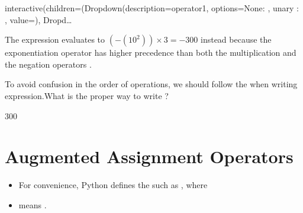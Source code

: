 \documentclass[letterpaper,10pt,english]{sphinxmanual}
\begin{document}
\begin{sphinxVerbatim}[commandchars=\\\{\}]
interactive(children=(Dropdown(description=\PYGZsq{}operator1\PYGZsq{}, options=\PYGZob{}\PYGZsq{}None\PYGZsq{}: \PYGZsq{}\PYGZsq{}, \PYGZsq{}unary \PYGZhy{}\PYGZsq{}: \PYGZsq{}\PYGZhy{}\PYGZsq{}\PYGZcb{}, value=\PYGZsq{}\PYGZsq{}), Dropd…
\end{sphinxVerbatim}

The expression evaluates to \((-(10^2))\times 3=-300\) instead because the exponentiation operator \sphinxcode{\sphinxupquote{**}} has higher precedence than both the multiplication \sphinxcode{\sphinxupquote{*}} and the negation operators \sphinxcode{\sphinxupquote{\sphinxhyphen{}}}.

 To avoid confusion in the order of operations, we should follow the  when writing expression.What is the proper way to write ?

\begin{sphinxVerbatim}[commandchars=\\\{\}]
    
  
\end{sphinxVerbatim}

\begin{sphinxVerbatim}[commandchars=\\\{\}]
\PYGZhy{}300
\end{sphinxVerbatim}


\section{Augmented Assignment Operators}
\label{\detokenize{Lecture2/Expressions and Arithmetic:augmented-assignment-operators}}\begin{itemize}
\item {} 
For convenience, Python defines the  such as \sphinxcode{\sphinxupquote{+=}}, where

\item {} 
 means .

\end{itemize}
\end{document}
